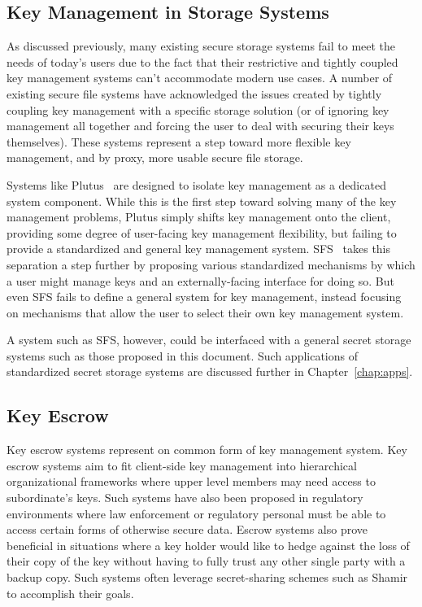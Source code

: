 \subsection{Key Management in Storage Systems}

As discussed previously, many existing secure storage systems fail to
meet the needs of today's users due to the fact that their restrictive
and tightly coupled key management systems can't accommodate modern
use cases. A number of existing secure file systems have acknowledged
the issues created by tightly coupling key management with a specific
storage solution (or of ignoring key management all together and
forcing the user to deal with securing their keys themselves). These
systems represent a step toward more flexible key management, and by
proxy, more usable secure file storage.

Systems like Plutus~\cite{kallahalla2003} are designed to isolate key
management as a dedicated system component. While this is the first
step toward solving many of the key management problems, Plutus simply
shifts key management onto the client, providing some degree of
user-facing key management flexibility, but failing to provide a
standardized and general key management
system. SFS~\cite{mazieres1999} takes this separation a step further
by proposing various standardized mechanisms by which a user might
manage keys and an externally-facing interface for doing so. But even
SFS fails to define a general system for key management, instead
focusing on mechanisms that allow the user to select their own key
management system.

A system such as SFS, however, could be interfaced with a general
secret storage systems such as those proposed in this document. Such
applications of standardized secret storage systems are discussed
further in Chapter~\ref{chap:apps}.

\subsection{Key Escrow}

Key escrow systems represent on common form of key management system.
Key escrow systems aim to fit client-side key management into
hierarchical organizational frameworks where upper level members may
need access to subordinate's keys. Such systems have also been
proposed in regulatory environments where law enforcement or
regulatory personal must be able to access certain forms of otherwise
secure data. Escrow systems also prove beneficial in situations where
a key holder would like to hedge against the loss of their copy of the
key without having to fully trust any other single party with a backup
copy. Such systems often leverage secret-sharing schemes such as
Shamir~\cite{shamir1979} to accomplish their goals.

